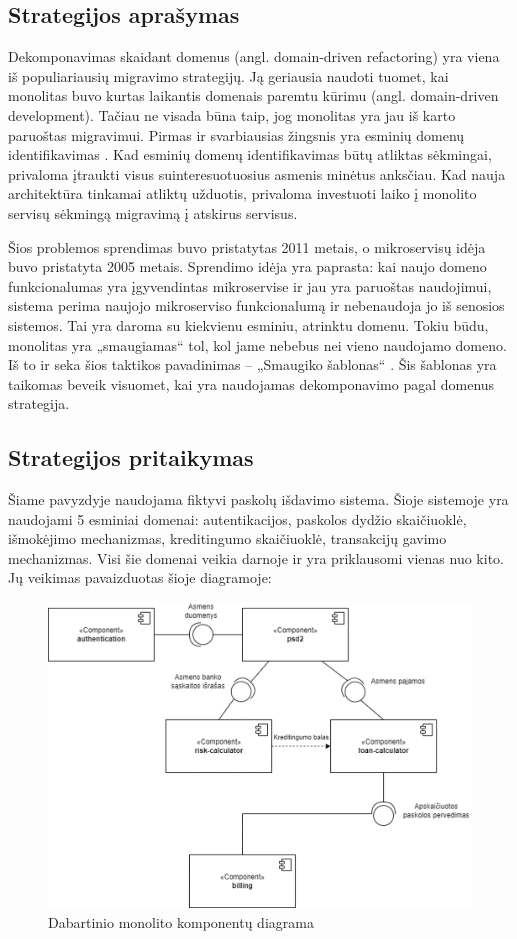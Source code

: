 \documentclass{VUMIFPSbakalaurinis}
\begin{document}
\subsection{Strategijos aprašymas}
Dekomponavimas skaidant domenus (angl. domain-driven refactoring) yra viena iš populiariausių migravimo strategijų. Ją geriausia naudoti tuomet, kai monolitas buvo kurtas laikantis domenais paremtu kūrimu (angl. domain-driven development). Tačiau ne visada būna taip, jog monolitas yra jau iš karto paruoštas migravimui. Pirmas ir svarbiausias žingsnis yra esminių domenų identifikavimas \cite{LZ22}. Kad esminių domenų identifikavimas būtų atliktas sėkmingai, privaloma įtraukti visus suinteresuotuosius asmenis minėtus anksčiau. Kad nauja architektūra tinkamai atliktų užduotis, privaloma investuoti laiko į monolito servisų sėkmingą migravimą į atskirus servisus. 

Šios problemos sprendimas buvo pristatytas 2011 metais, o mikroservisų idėja buvo pristatyta 2005 metais. Sprendimo idėja yra paprasta: kai naujo domeno funkcionalumas yra įgyvendintas mikroservise ir jau yra paruoštas naudojimui, sistema perima naujojo mikroserviso funkcionalumą ir nebenaudoja jo iš senosios sistemos. Tai yra daroma su kiekvienu esminiu, atrinktu domenu. Tokiu būdu, monolitas yra „smaugiamas“ tol, kol jame nebebus nei vieno naudojamo domeno. Iš to ir seka šios taktikos pavadinimas – „Smaugiko šablonas“ \cite{Beh18}. Šis šablonas yra taikomas beveik visuomet, kai yra naudojamas dekomponavimo pagal domenus strategija.

\subsection{Strategijos pritaikymas}
Šiame pavyzdyje naudojama fiktyvi paskolų išdavimo sistema. Šioje sistemoje yra naudojami 5 esminiai domenai: autentikacijos, paskolos dydžio skaičiuoklė, išmokėjimo mechanizmas, kreditingumo skaičiuoklė, transakcijų gavimo mechanizmas. Visi šie domenai veikia darnoje ir yra priklausomi vienas nuo kito. Jų veikimas pavaizduotas šioje diagramoje:
\begin{figure}[H]
    \centering
    \includegraphics[scale=0.9]{img/komponentu-diagrama.png}
    \caption{Dabartinio monolito komponentų diagrama}
    \label{img:komponentu-diagrama}
\end{figure}
\end{document}
